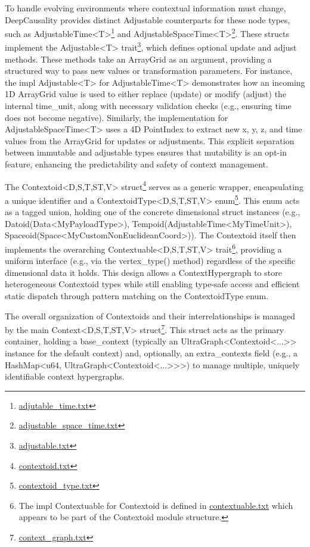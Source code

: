 To handle evolving environments where contextual information must change, DeepCausality provides distinct Adjustable counterparts for these node types, such as AdjustableTime<T>\footnote{\url{adjutable_time.txt}} and AdjustableSpaceTime<T>\footnote{\url{adjustable_space_time.txt}}. These structs implement the Adjustable<T> trait\footnote{\url{adjustable.txt}}, which defines optional update and adjust methods. These methods take an ArrayGrid as an argument, providing a structured way to pass new values or transformation parameters. For instance, the impl Adjustable<T> for AdjustableTime<T> demonstrates how an incoming 1D ArrayGrid value is used to either replace (update) or modify (adjust) the internal time\_unit, along with necessary validation checks (e.g., ensuring time does not become negative). Similarly, the implementation for AdjustableSpaceTime<T> uses a 4D PointIndex to extract new x, y, z, and time values from the ArrayGrid for updates or adjustments. This explicit separation between immutable and adjustable types ensures that mutability is an opt-in feature, enhancing the predictability and safety of context management.

The Contextoid<D,S,T,ST,V> struct\footnote{\url{contextoid.txt}} serves as a generic wrapper, encapsulating a unique identifier and a ContextoidType<D,S,T,ST,V> enum\footnote{\url{contextoid_type.txt}}. This enum acts as a tagged union, holding one of the concrete dimensional struct instances (e.g., Datoid(Data<MyPayloadType>), Tempoid(AdjustableTime<MyTimeUnit>), Spaceoid(Space<MyCustomNonEuclideanCoord>)). The Contextoid itself then implements the overarching Contextuable<D,S,T,ST,V> trait\footnote{The impl Contextuable for Contextoid is defined in \url{contextuable.txt} which appears to be part of the Contextoid module structure.}, providing a uniform interface (e.g., via the vertex\_type() method) regardless of the specific dimensional data it holds. This design allows a ContextHypergraph to store heterogeneous Contextoid types while still enabling type-safe access and efficient static dispatch through pattern matching on the ContextoidType enum.

The overall organization of Contextoids and their interrelationships is managed by the main Context<D,S,T,ST,V> struct\footnote{\url{context_graph.txt}}. This struct acts as the primary container, holding a base\_context (typically an UltraGraph<Contextoid<...>> instance for the default context) and, optionally, an extra\_contexts field (e.g., a HashMap<u64, UltraGraph<Contextoid<...>>>) to manage multiple, uniquely identifiable context hypergraphs.

